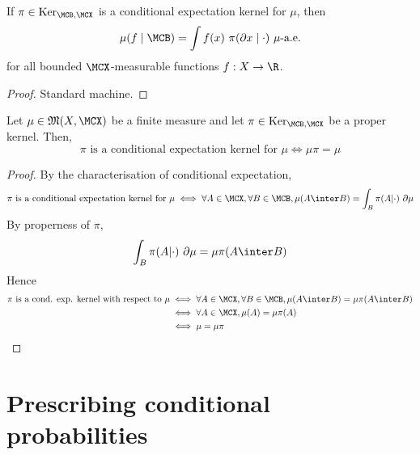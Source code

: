 \begin{lemma}
    \label{lem:cond-exp-proper-ker-integral}
    \leanok

    If $\pi \in \text{Ker}_{\MCB, \MCX}$ is a conditional expectation kernel for $\mu$, then
    $$\mu(f\mid \MCB) = \int f(x)\ \pi(\partial x\mid\cdot)\ \mu\text{-a.e.}$$
    for all bounded $\MCX$-measurable functions $f : X \to \R$.
\end{lemma}
\begin{proof}

    Standard machine.
\end{proof}

\begin{lemma}
    \label{lem:cond-exp-proper-ker-bind}
    \leanok

    Let $\mu\in\mathfrak{M}(X,\MCX)$ be a finite measure and let $\pi\in\text{Ker}_{\MCB,\MCX}$ be a proper kernel. Then,
    $$\pi \text{ is a conditional expectation kernel for }\mu \iff \mu\pi = \mu$$
\end{lemma}
\begin{proof}
    \leanok

    By the characterisation of conditional expectation,
    $$\pi \text{ is a conditional expectation kernel for }\mu \iff \forall A \in \MCX, \forall B \in \MCB, \mu(A \inter B) = \int_B \pi(A|\cdot)\ \partial\mu$$
    By properness of $\pi$,
    $$\int_B \pi(A|\cdot)\ \partial\mu = \mu\pi(A \inter B)$$
    Hence
    \begin{align}
        \pi \text{ is a cond. exp. kernel with respect to }\mu
        & \iff \forall A \in \MCX, \forall B \in \MCB, \mu(A \inter B) = \mu\pi(A \inter B) \\
        & \iff \forall A \in \MCX, \mu(A) = \mu\pi(A) \\
        & \iff \mu = \mu\pi
    \end{align}
\end{proof}


\section{Prescribing conditional probabilities}

